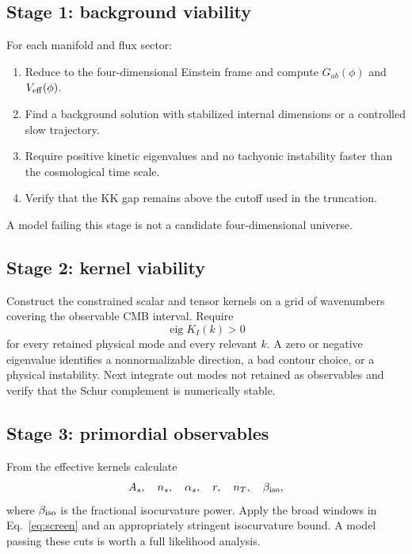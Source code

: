 \documentclass[aps,prd,twocolumn,superscriptaddress,nofootinbib,longbibliography]{revtex4-2}
\begin{document}
\subsection{Stage 1: background viability}
For each manifold and flux sector:
\begin{enumerate}
\item Reduce to the four-dimensional Einstein frame and compute $G_{ab}(\phi)$ and $V_{\rm eff}(\phi)$.
\item Find a background solution with stabilized internal dimensions or a controlled slow trajectory.
\item Require positive kinetic eigenvalues and no tachyonic instability faster than the cosmological time scale.
\item Verify that the KK gap remains above the cutoff used in the truncation.
\end{enumerate}
A model failing this stage is not a candidate four-dimensional universe.

\subsection{Stage 2: kernel viability}
Construct the constrained scalar and tensor kernels on a grid of wavenumbers covering the observable CMB interval. Require
\begin{equation}
\operatorname{eig}K_I(k)>0
\end{equation}
for every retained physical mode and every relevant $k$. A zero or negative eigenvalue identifies a nonnormalizable direction, a bad contour choice, or a physical instability. Next integrate out modes not retained as observables and verify that the Schur complement is numerically stable.

\subsection{Stage 3: primordial observables}
From the effective kernels calculate
\begin{equation}
A_s,\quad n_s,\quad\alpha_s,\quad r,\quad n_T,
\quad\beta_{\rm iso},
\end{equation}
where $\beta_{\rm iso}$ is the fractional isocurvature power. Apply the broad windows in Eq.~\eqref{eq:screen} and an appropriately stringent isocurvature bound. A model passing these cuts is worth a full likelihood analysis.
\end{document}
